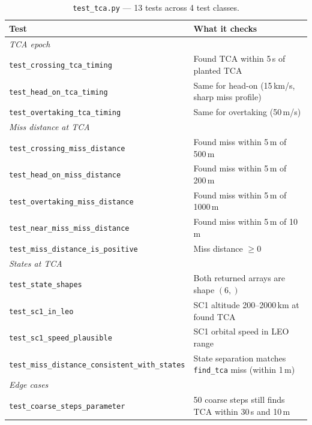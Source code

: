 \documentclass[11pt]{article}
\begin{document}
\begin{table}[htb]
\centering
\small
\caption{\texttt{test\_tca.py} — 13 tests across 4 test classes.}
\label{tab:test_tca}
\begin{tabular}{lp{10cm}}
  \toprule
  Test & What it checks \\
  \midrule
  \multicolumn{2}{l}{\textit{TCA epoch}} \\
  \texttt{test\_crossing\_tca\_timing} & Found TCA within 5\,s of planted TCA \\
  \texttt{test\_head\_on\_tca\_timing} & Same for head-on (15\,km/s, sharp miss profile) \\
  \texttt{test\_overtaking\_tca\_timing} & Same for overtaking (50\,m/s) \\
  \midrule
  \multicolumn{2}{l}{\textit{Miss distance at TCA}} \\
  \texttt{test\_crossing\_miss\_distance} & Found miss within 5\,m of 500\,m \\
  \texttt{test\_head\_on\_miss\_distance} & Found miss within 5\,m of 200\,m \\
  \texttt{test\_overtaking\_miss\_distance} & Found miss within 5\,m of 1000\,m \\
  \texttt{test\_near\_miss\_miss\_distance} & Found miss within 5\,m of 10\,m \\
  \texttt{test\_miss\_distance\_is\_positive} & Miss distance $\ge 0$ \\
  \midrule
  \multicolumn{2}{l}{\textit{States at TCA}} \\
  \texttt{test\_state\_shapes} & Both returned arrays are shape $(6,)$ \\
  \texttt{test\_sc1\_in\_leo} & SC1 altitude 200--2000\,km at found TCA \\
  \texttt{test\_sc1\_speed\_plausible} & SC1 orbital speed in LEO range \\
  \texttt{test\_miss\_distance\_consistent\_with\_states} & State separation matches \texttt{find\_tca} miss (within 1\,m) \\
  \midrule
  \multicolumn{2}{l}{\textit{Edge cases}} \\
  \texttt{test\_coarse\_steps\_parameter} & 50 coarse steps still finds TCA within 30\,s and 10\,m \\
  \bottomrule
\end{tabular}
\end{table}
\end{document}
